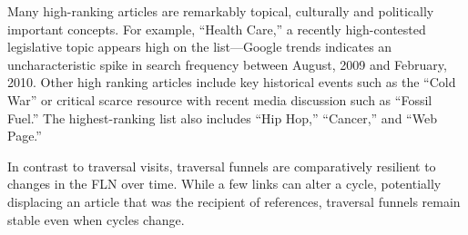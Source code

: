\documentclass[pre,twocolumn,twoside,superscriptaddress,floatfix, aps, 10pt]{revtex4-1}
\begin{document}
Many high-ranking articles are remarkably topical, culturally and politically important concepts.  For example, ``Health Care,'' a recently high-contested legislative topic appears high on the list---Google trends indicates an uncharacteristic spike in search frequency between August, 2009 and February, 2010.
Other high ranking articles include key historical events such as the ``Cold War'' or critical scarce resource with recent 
media discussion such as ``Fossil Fuel.'' 
The highest-ranking list also includes ``Hip Hop,'' ``Cancer,'' and ``Web Page.''

In contrast to traversal visits, traversal funnels are comparatively resilient to changes in the FLN over time. 
While a few links can alter a cycle, potentially displacing an article that was the recipient of references, traversal funnels remain stable even when cycles change.
\end{document}
